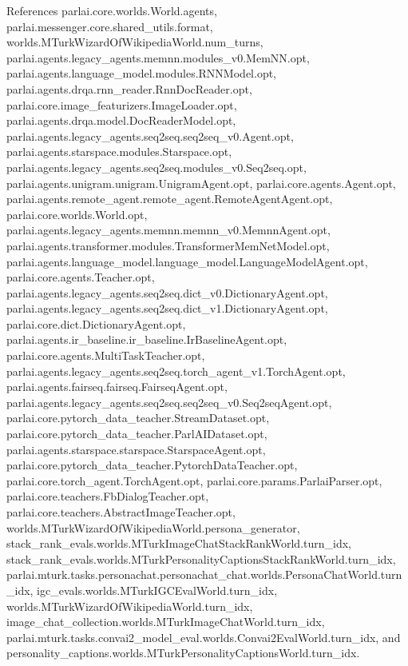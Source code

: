 References parlai.\+core.\+worlds.\+World.\+agents, parlai.\+messenger.\+core.\+shared\+\_\+utils.\+format, worlds.\+M\+Turk\+Wizard\+Of\+Wikipedia\+World.\+num\+\_\+turns, parlai.\+agents.\+legacy\+\_\+agents.\+memnn.\+modules\+\_\+v0.\+Mem\+N\+N.\+opt, parlai.\+agents.\+language\+\_\+model.\+modules.\+R\+N\+N\+Model.\+opt, parlai.\+agents.\+drqa.\+rnn\+\_\+reader.\+Rnn\+Doc\+Reader.\+opt, parlai.\+core.\+image\+\_\+featurizers.\+Image\+Loader.\+opt, parlai.\+agents.\+drqa.\+model.\+Doc\+Reader\+Model.\+opt, parlai.\+agents.\+legacy\+\_\+agents.\+seq2seq.\+seq2seq\+\_\+v0.\+Agent.\+opt, parlai.\+agents.\+starspace.\+modules.\+Starspace.\+opt, parlai.\+agents.\+legacy\+\_\+agents.\+seq2seq.\+modules\+\_\+v0.\+Seq2seq.\+opt, parlai.\+agents.\+unigram.\+unigram.\+Unigram\+Agent.\+opt, parlai.\+core.\+agents.\+Agent.\+opt, parlai.\+agents.\+remote\+\_\+agent.\+remote\+\_\+agent.\+Remote\+Agent\+Agent.\+opt, parlai.\+core.\+worlds.\+World.\+opt, parlai.\+agents.\+legacy\+\_\+agents.\+memnn.\+memnn\+\_\+v0.\+Memnn\+Agent.\+opt, parlai.\+agents.\+transformer.\+modules.\+Transformer\+Mem\+Net\+Model.\+opt, parlai.\+agents.\+language\+\_\+model.\+language\+\_\+model.\+Language\+Model\+Agent.\+opt, parlai.\+core.\+agents.\+Teacher.\+opt, parlai.\+agents.\+legacy\+\_\+agents.\+seq2seq.\+dict\+\_\+v0.\+Dictionary\+Agent.\+opt, parlai.\+agents.\+legacy\+\_\+agents.\+seq2seq.\+dict\+\_\+v1.\+Dictionary\+Agent.\+opt, parlai.\+core.\+dict.\+Dictionary\+Agent.\+opt, parlai.\+agents.\+ir\+\_\+baseline.\+ir\+\_\+baseline.\+Ir\+Baseline\+Agent.\+opt, parlai.\+core.\+agents.\+Multi\+Task\+Teacher.\+opt, parlai.\+agents.\+legacy\+\_\+agents.\+seq2seq.\+torch\+\_\+agent\+\_\+v1.\+Torch\+Agent.\+opt, parlai.\+agents.\+fairseq.\+fairseq.\+Fairseq\+Agent.\+opt, parlai.\+agents.\+legacy\+\_\+agents.\+seq2seq.\+seq2seq\+\_\+v0.\+Seq2seq\+Agent.\+opt, parlai.\+core.\+pytorch\+\_\+data\+\_\+teacher.\+Stream\+Dataset.\+opt, parlai.\+core.\+pytorch\+\_\+data\+\_\+teacher.\+Parl\+A\+I\+Dataset.\+opt, parlai.\+agents.\+starspace.\+starspace.\+Starspace\+Agent.\+opt, parlai.\+core.\+pytorch\+\_\+data\+\_\+teacher.\+Pytorch\+Data\+Teacher.\+opt, parlai.\+core.\+torch\+\_\+agent.\+Torch\+Agent.\+opt, parlai.\+core.\+params.\+Parlai\+Parser.\+opt, parlai.\+core.\+teachers.\+Fb\+Dialog\+Teacher.\+opt, parlai.\+core.\+teachers.\+Abstract\+Image\+Teacher.\+opt, worlds.\+M\+Turk\+Wizard\+Of\+Wikipedia\+World.\+persona\+\_\+generator, stack\+\_\+rank\+\_\+evals.\+worlds.\+M\+Turk\+Image\+Chat\+Stack\+Rank\+World.\+turn\+\_\+idx, stack\+\_\+rank\+\_\+evals.\+worlds.\+M\+Turk\+Personality\+Captions\+Stack\+Rank\+World.\+turn\+\_\+idx, parlai.\+mturk.\+tasks.\+personachat.\+personachat\+\_\+chat.\+worlds.\+Persona\+Chat\+World.\+turn\+\_\+idx, igc\+\_\+evals.\+worlds.\+M\+Turk\+I\+G\+C\+Eval\+World.\+turn\+\_\+idx, worlds.\+M\+Turk\+Wizard\+Of\+Wikipedia\+World.\+turn\+\_\+idx, image\+\_\+chat\+\_\+collection.\+worlds.\+M\+Turk\+Image\+Chat\+World.\+turn\+\_\+idx, parlai.\+mturk.\+tasks.\+convai2\+\_\+model\+\_\+eval.\+worlds.\+Convai2\+Eval\+World.\+turn\+\_\+idx, and personality\+\_\+captions.\+worlds.\+M\+Turk\+Personality\+Captions\+World.\+turn\+\_\+idx.

